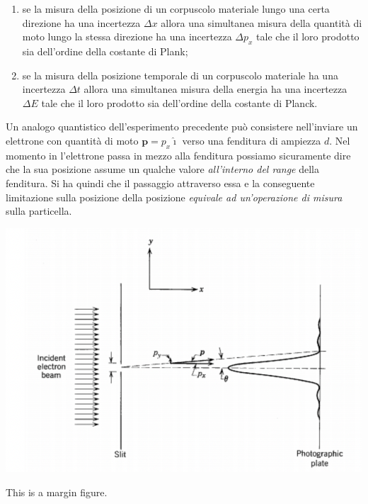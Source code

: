 \begin{enumerate}
    \tightlist
    \item
    se la misura della posizione di un corpuscolo materiale lungo una
    certa direzione ha una incertezza \(\Delta x\) allora una simultanea
    misura della quantità di moto lungo la stessa direzione ha una
    incertezza \(\Delta p_x\) tale che il loro prodotto sia dell'ordine
    della costante di Plank;
    \item
    se la misura della posizione temporale di un corpuscolo materiale ha
    una incertezza \(\Delta t\) allora una simultanea misura della energia
    ha una incertezza \(\Delta E\) tale che il loro prodotto sia
    dell'ordine della costante di Planck.
\end{enumerate}

Un analogo quantistico dell'esperimento precedente può consistere
nell'inviare un elettrone con quantità di moto
\(\bm{p} = p_{x} \hat{\imath}\) verso una fenditura di ampiezza \(d\).
Nel
momento in l'elettrone passa in mezzo alla fenditura possiamo
sicuramente dire che la sua posizione assume un qualche valore
\emph{all'interno del range} della fenditura.
Si ha quindi che il passaggio attraverso essa e la conseguente limitazione sulla posizione
della posizione \emph{equivale ad un'operazione di misura} sulla
particella.

\begin{marginfigure}
    \includegraphics[width = 1.3 \textwidth, height = 1.3 \textheight]{figs/beam-electron-experiment}
    \caption{This is a margin figure.}
    \label{fig:beam-electron-experiment}
\end{marginfigure}

